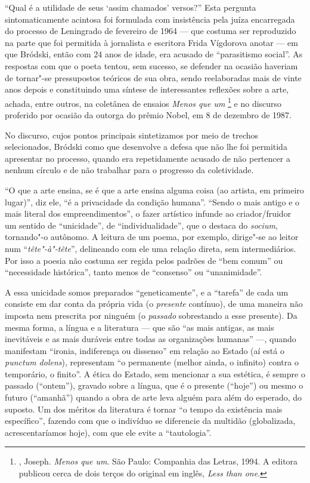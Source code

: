 {``Qual é a utilidade de seus `assim chamados' versos?'' Esta pergunta sintomaticamente acintosa foi formulada com insistência pela
juíza encarregada do processo de Leningrado de fevereiro de 1964 ---
que costuma ser reproduzido na parte que foi permitida à jornalista e escritora Frida Vígdorova
anotar --- em que Bródski, então com 24 anos de idade,
era acusado de ``parasitismo social''. As respostas com que o poeta
tentou, sem sucesso, se defender na ocasião haveriam de tornar"-se
pressupostos teóricos de sua obra, sendo reelaboradas mais de vinte anos
depois e constituindo uma síntese de interessantes reflexões
sobre a arte, achada, entre outros, na coletânea de ensaios \emph{Menos que um}
\footnote{, Joseph. \emph{Menos que um}. São Paulo: Companhia das Letras, 1994.
A editora publicou cerca de dois terços do original em inglês, \emph{Less than one}.} e no
discurso proferido por ocasião da outorga do prêmio Nobel, em 8 de dezembro de 1987.

No discurso, cujos pontos principais sintetizamos por meio de trechos selecionados, Bródski como que
desenvolve a defesa que não lhe foi permitida apresentar no processo,
quando era repetidamente acusado de não pertencer a nenhum círculo e de
não trabalhar para o progresso da coletividade.

``O que a arte ensina, se é que a arte ensina alguma coisa (ao
artista, em primeiro lugar)'', diz ele, ``é a privacidade da
condição humana''. ``Sendo o mais antigo e o mais literal dos
empreendimentos'', o fazer artístico infunde ao criador/fruidor um sentido de
``unicidade'', de ``individualidade'', que o destaca do \emph{socium}, tornando"-o
autônomo. A leitura de um poema, por exemplo, dirige"-se ao leitor num
``\emph{tête"-à"-tête}'', delineando com ele uma relação direta, sem
intermediários. Por isso a poesia não costuma ser regida pelos padrões
de ``bem comum'' ou ``necessidade histórica'', tanto menos de
``consenso'' ou ``unanimidade''.

A essa unicidade somos preparados ``geneticamente'', e a ``tarefa'' de cada um
consiste em dar conta da própria vida (o \emph{presente} contínuo), de
uma maneira não imposta nem prescrita por ninguém (o \emph{passado}
sobrestando a esse presente). Da mesma forma, a língua e
a literatura --- que são ``as mais antigas, as mais
inevitáveis e as mais duráveis entre todas as organizações humanas'' ---,
quando manifestam ``ironia, indiferença ou dissenso'' em relação ao Estado
(aí está o \emph{punctum dolens}), representam ``o permanente (melhor ainda, o infinito) contra o temporário, o finito''. A ética do
Estado, sem mencionar a sua estética, é sempre o passado (``ontem''), gravado
sobre a língua, que é o presente (``hoje'') ou mesmo o futuro (``amanhã'') quando a obra de arte
leva alguém para além do esperado, do
suposto. Um dos méritos da literatura é tornar ``o tempo da existência
mais específico'', fazendo com que o indivíduo se diferencie da multidão
(globalizada, acrescentaríamos hoje), com que ele evite a ``tautologia''.

}
